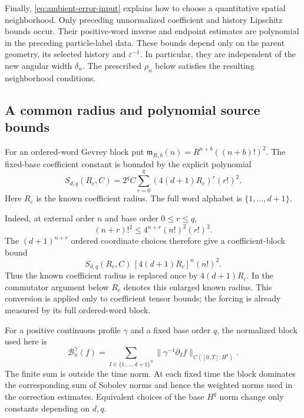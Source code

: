 \documentclass[11pt]{article}
\theoremstyle{definition}
\begin{document}
Finally, \eqref{eq:ambient-error-input} explains how to choose a
quantitative spatial neighborhood. Only preceding unnormalized coefficient
and history Lipschitz bounds occur. Their positive-word inverse and
endpoint estimates are polynomial in the preceding particle-label data.
These bounds depend only on the parent geometry, its selected history
and $\varepsilon^{-1}$. In particular, they are independent of the new
angular width $\delta_n$. The prescribed $\rho_n$ below satisfies
the resulting neighborhood conditions.

\subsection{A common radius and polynomial source bounds}

For an ordered-word Gevrey block put
$\mathfrak m_{R,b}(n)=R^{n+b}((n+b)!)^2$. The fixed-base coefficient
constant is bounded by the explicit polynomial
\[
 S_{d,q}(R_c,C)=2^q C\sum_{r=0}^q(4(d+1)R_c)^r(r!)^2.
\]
Here $R_c$ is the known coefficient radius. The full word alphabet is
$\{1,\ldots,d+1\}$.

Indeed, at external order $n$ and base order $0\leq r\leq q$,
\[
 (n+r)!^2\leq4^{n+r}(n!)^2(r!)^2.
\]
The $(d+1)^{n+r}$ ordered coordinate choices therefore give a
coefficient-block bound
\[
 S_{d,q}(R_c,C)\,[4(d+1)R_c]^n(n!)^2.
\]
Thus the known coefficient radius is replaced once by
$4(d+1)R_c$. In the commutator argument below $R_c$ denotes this
enlarged known radius. This conversion is applied only to coefficient
tensor bounds; the forcing is already measured by its full ordered-word
block.

For a positive continuous profile $\gamma$ and a fixed base order $q$,
the normalized block used here is
\[
 \mathcal B_n^\gamma(f)=
 \sum_{I\in\{1,\ldots,d+1\}^{n}}
 \bigl\|\gamma^{-1}\partial_I f\bigr\|_{C([0,T];H^q)}.
\]
The finite sum is outside the time norm. At each fixed time the block
dominates the corresponding sum of Sobolev norms and hence the
weighted norms used in the correction estimates. Equivalent choices
of the base $H^q$ norm change only constants depending on $d,q$.
\end{document}
